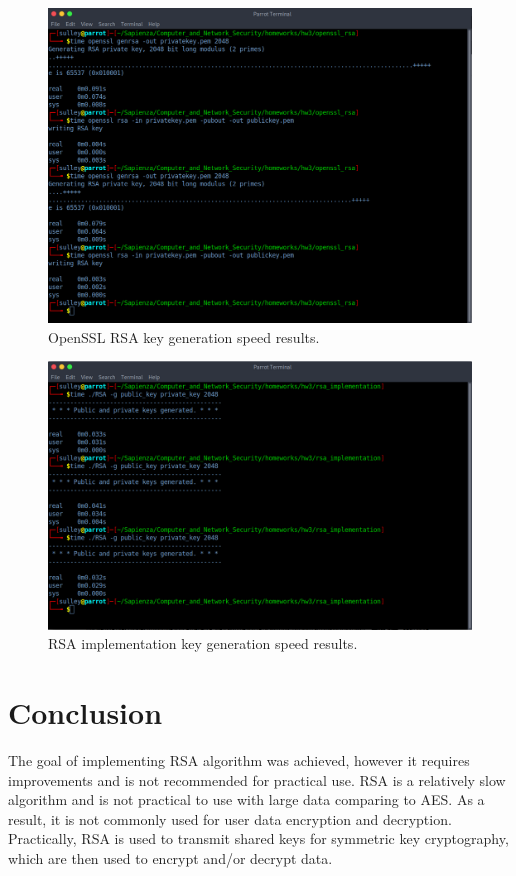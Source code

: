 \documentclass[11 pt]{article}
\begin{document}
\begin{figure}[H]
    \centering
    \includegraphics[width=0.9\linewidth]{openssl_rsa_keygen_speed.png}
    \caption{OpenSSL RSA key generation speed results.}
    \label{fig:openssl-rsa-keygen-speed}
\end{figure}

\begin{figure}[H]
    \centering
    \includegraphics[width=0.9\linewidth]{rsa_implementation_keygen_speed.png}
    \caption{RSA implementation key generation speed results.}
    \label{fig:rsa-implementation-keygen-speed}
\end{figure}

\section{Conclusion}
The goal of implementing RSA algorithm was achieved, however it requires improvements and is not recommended for practical use. RSA is a relatively slow algorithm and is not practical to use with large data comparing to AES. As a result, it is not commonly used for user data encryption and decryption. Practically, RSA is used to transmit shared keys for symmetric key cryptography, which are then used to encrypt and/or decrypt data. 
\end{document}
